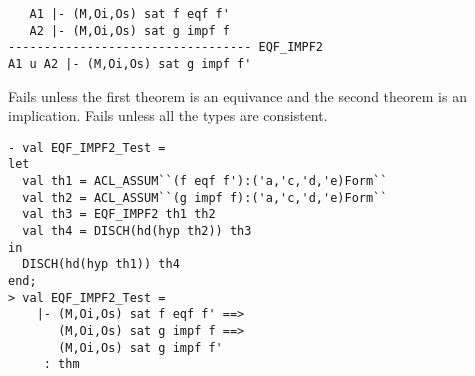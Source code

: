 


\egroup

\DESCRIBE
\begin{verbatim}
   A1 |- (M,Oi,Os) sat f eqf f'
   A2 |- (M,Oi,Os) sat g impf f
---------------------------------- EQF_IMPF2
A1 u A2 |- (M,Oi,Os) sat g impf f'
\end{verbatim}

\FAILURE
Fails unless the first theorem is an equivance and the second theorem
is an implication.  Fails unless all the types are consistent.

\EXAMPLE
\begin{holboxed}
\begin{verbatim}
- val EQF_IMPF2_Test =
let
  val th1 = ACL_ASSUM``(f eqf f'):('a,'c,'d,'e)Form``
  val th2 = ACL_ASSUM``(g impf f):('a,'c,'d,'e)Form``
  val th3 = EQF_IMPF2 th1 th2
  val th4 = DISCH(hd(hyp th2)) th3
in
  DISCH(hd(hyp th1)) th4
end;
> val EQF_IMPF2_Test =
    |- (M,Oi,Os) sat f eqf f' ==>
       (M,Oi,Os) sat g impf f ==>
       (M,Oi,Os) sat g impf f'
     : thm
\end{verbatim}
\end{holboxed}


